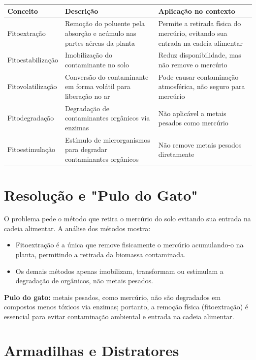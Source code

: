 \documentclass{article}
\begin{document}
\begin{tabular}{|l|p{6cm}|p{6cm}|}
\hline
\textbf{Conceito} & \textbf{Descrição} & \textbf{Aplicação no contexto} \\
\hline
Fitoextração & Remoção do poluente pela absorção e acúmulo nas partes aéreas da planta & Permite a retirada física do mercúrio, evitando sua entrada na cadeia alimentar \\
\hline
Fitoestabilização & Imobilização do contaminante no solo & Reduz disponibilidade, mas não remove o mercúrio \\
\hline
Fitovolatilização & Conversão do contaminante em forma volátil para liberação no ar & Pode causar contaminação atmosférica, não seguro para mercúrio \\
\hline
Fitodegradação & Degradação de contaminantes orgânicos via enzimas & Não aplicável a metais pesados como mercúrio \\
\hline
Fitoestimulação & Estímulo de microrganismos para degradar contaminantes orgânicos & Não remove metais pesados diretamente \\
\hline
\end{tabular}

\section*{Resolução e "Pulo do Gato"}

O problema pede o método que retira o mercúrio do solo evitando sua entrada na cadeia alimentar. A análise dos métodos mostra:

\begin{itemize}
  \item Fitoextração é a única que remove fisicamente o mercúrio acumulando-o na planta, permitindo a retirada da biomassa contaminada.
  \item Os demais métodos apenas imobilizam, transformam ou estimulam a degradação de orgânicos, não metais pesados.
\end{itemize}

\textbf{Pulo do gato:} metais pesados, como mercúrio, não são degradados em compostos menos tóxicos via enzimas; portanto, a remoção física (fitoextração) é essencial para evitar contaminação ambiental e entrada na cadeia alimentar.

\section*{Armadilhas e Distratores}
\end{document}

